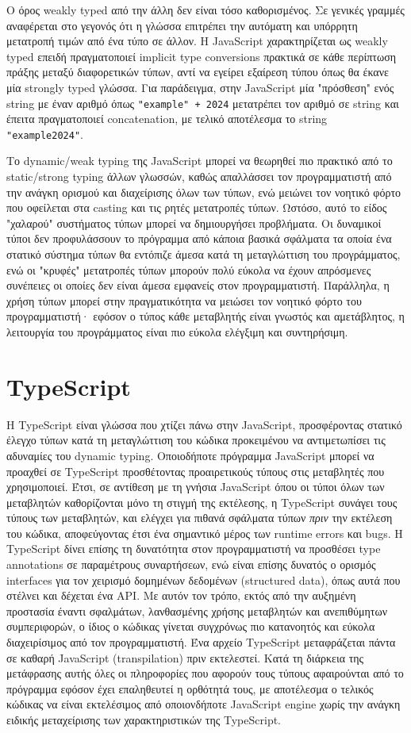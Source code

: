 \documentclass[../thesis.tex]{subfiles}
\begin{document}
Ο όρος weakly typed από την άλλη δεν είναι τόσο καθορισμένος.
Σε γενικές γραμμές αναφέρεται στο γεγονός ότι η γλώσσα επιτρέπει την αυτόματη και υπόρρητη μετατροπή τιμών από ένα τύπο σε άλλον.
Η JavaScript χαρακτηρίζεται ως weakly typed επειδή πραγματοποιεί implicit type conversions πρακτικά σε κάθε περίπτωση πράξης μεταξύ διαφορετικών τύπων, αντί να εγείρει εξαίρεση τύπου όπως θα έκανε μία strongly typed γλώσσα.
Για παράδειγμα, στην JavaScript μία "πρόσθεση" ενός string με έναν αριθμό όπως \verb|"example" + 2024| μετατρέπει τον αριθμό σε string και έπειτα πραγματοποιεί concatenation, με τελικό αποτέλεσμα το string \verb|"example2024"|.

Το dynamic/weak typing της JavaScript μπορεί να θεωρηθεί πιο πρακτικό από το static/strong typing άλλων γλωσσών, καθώς απαλλάσσει τον προγραμματιστή από την ανάγκη ορισμού και διαχείρισης όλων των τύπων, ενώ μειώνει τον νοητικό φόρτο  που οφείλεται στα casting και τις ρητές μετατροπές τύπων.
Ωστόσο, αυτό το είδος "χαλαρού" συστήματος τύπων μπορεί να δημιουργήσει προβλήματα.
Οι δυναμικοί τύποι δεν προφυλάσσουν το πρόγραμμα από κάποια βασικά σφάλματα τα οποία ένα στατικό σύστημα τύπων θα εντόπιζε άμεσα κατά τη μεταγλώττιση του προγράμματος, ενώ οι "κρυφές" μετατροπές τύπων μπορούν πολύ εύκολα να έχουν απρόσμενες συνέπειες οι οποίες δεν είναι άμεσα εμφανείς στον προγραμματιστή.
Παράλληλα, η χρήση τύπων μπορεί στην πραγματικότητα να μειώσει τον νοητικό φόρτο του προγραμματιστή· εφόσον ο τύπος κάθε μεταβλητής είναι γνωστός και αμετάβλητος, η λειτουργία του προγράμματος είναι πιο εύκολα ελέγξιμη και συντηρήσιμη.

\section{TypeScript}
Η TypeScript είναι γλώσσα που χτίζει πάνω στην JavaScript, προσφέροντας στατικό έλεγχο τύπων κατά τη μεταγλώττιση του κώδικα προκειμένου να αντιμετωπίσει τις αδυναμίες του dynamic typing.
Οποιοδήποτε πρόγραμμα JavaScript μπορεί να προαχθεί σε TypeScript προσθέτοντας προαιρετικούς τύπους στις μεταβλητές που χρησιμοποιεί.
Έτσι, σε αντίθεση με τη γνήσια JavaScript όπου οι τύποι όλων των μεταβλητών καθορίζονται μόνο τη στιγμή της εκτέλεσης, η TypeScript συνάγει τους τύπους των μεταβλητών, και ελέγχει για πιθανά σφάλματα τύπων \textit{πριν} την εκτέλεση του κώδικα, αποφεύγοντας έτσι ένα σημαντικό μέρος των runtime errors και bugs.
Η TypeScript δίνει επίσης τη δυνατότητα στον προγραμματιστή να προσθέσει type annotations σε παραμέτρους συναρτήσεων, ενώ είναι επίσης δυνατός ο ορισμός interfaces για τον χειρισμό δομημένων δεδομένων (structured data), όπως αυτά που στέλνει και δέχεται ένα API.
Με αυτόν τον τρόπο, εκτός από την αυξημένη προστασία έναντι σφαλμάτων, λανθασμένης χρήσης μεταβλητών και ανεπιθύμητων συμπεριφορών, ο ίδιος ο κώδικας γίνεται συγχρόνως πιο κατανοητός και εύκολα διαχειρίσιμος από τον προγραμματιστή.
Ένα αρχείο TypeScript μεταφράζεται πάντα σε καθαρή JavaScript (transpilation) πριν εκτελεστεί.
Κατά τη διάρκεια της μετάφρασης αυτής όλες οι πληροφορίες που αφορούν τους τύπους αφαιρούνται από το πρόγραμμα εφόσον έχει επαληθευτεί η ορθότητά τους, με αποτέλεσμα ο τελικός κώδικας να είναι εκτελέσιμος από οποιονδήποτε JavaScript engine χωρίς την ανάγκη ειδικής μεταχείρισης των χαρακτηριστικών της TypeScript.
\end{document}
